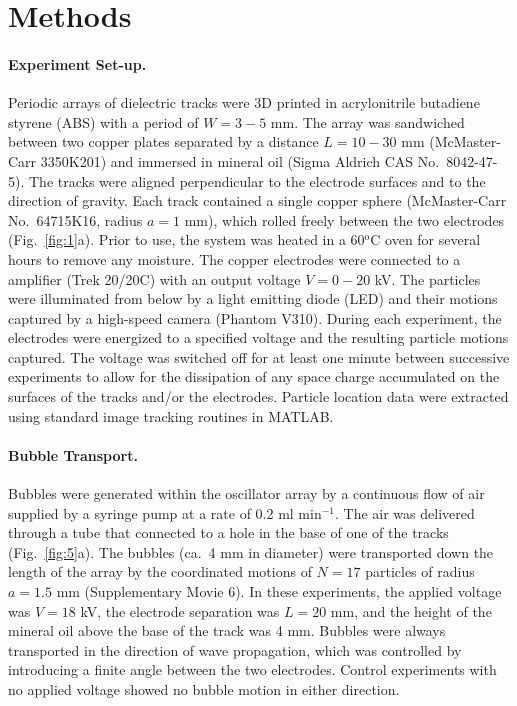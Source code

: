 \section{Methods}

\paragraph{Experiment Set-up.} 
Periodic arrays of dielectric tracks were 3D printed in acrylonitrile butadiene styrene (ABS) with a period of $W=3-5$ mm. The array was sandwiched between two copper plates separated by a distance $L=10-30$ mm (McMaster-Carr 3350K201) and immersed in mineral oil (Sigma Aldrich CAS No.~8042-47-5). The tracks were aligned perpendicular to the electrode surfaces and to the direction of gravity. Each track contained a single copper sphere (McMaster-Carr No.~64715K16, radius $a=1$ mm), which rolled freely between the two electrodes (Fig.~\ref{fig:1}a). Prior to use, the system was heated in a 60$^\text{o}$C oven for several hours to remove any moisture. The copper electrodes were connected to a amplifier (Trek 20/20C) with an output voltage $V=0-20$ kV.  The particles were illuminated from below by a light emitting diode (LED) and their motions captured by a high-speed camera (Phantom V310).  During each experiment, the electrodes were energized to a specified voltage and the resulting particle motions captured. The voltage was switched off for at least one minute between successive experiments to allow for the dissipation of any space charge accumulated on the surfaces of the tracks and/or the electrodes.  Particle location data were extracted using standard image tracking routines in MATLAB.


\paragraph{Bubble Transport.} 
Bubbles were generated within the oscillator array by a continuous flow of air supplied by a syringe pump at a rate of 0.2 ml min$^{-1}$. The air was delivered through a tube that connected to a hole in the base of one of the tracks (Fig.~\ref{fig:5}a).  The bubbles (ca.~4 mm in diameter) were transported down the length of the array by the coordinated motions of $N=17$ particles of radius $a=1.5$ mm (Supplementary Movie 6).  In these experiments, the applied voltage was $V=18$ kV, the electrode separation was $L=20$ mm, and the height of the mineral oil above the base of the track was 4 mm.  Bubbles were always transported in the direction of wave propagation, which was controlled by introducing a finite angle between the two electrodes.  Control experiments with no applied voltage showed no bubble motion in either direction.



